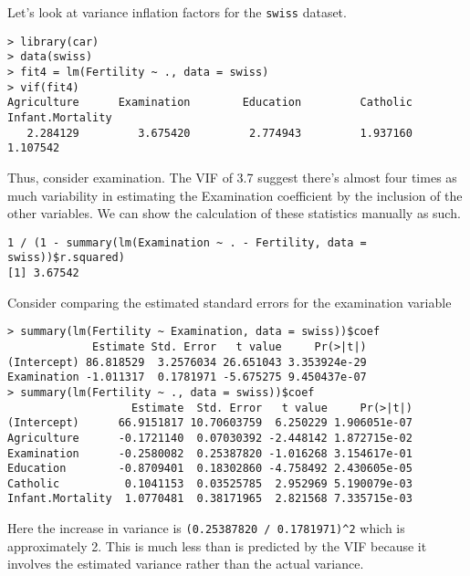 Let's look at variance inflation factors for the \texttt{swiss} dataset.
\begin{verbatim}
> library(car)
> data(swiss)
> fit4 = lm(Fertility ~ ., data = swiss)
> vif(fit4)
Agriculture      Examination        Education         Catholic Infant.Mortality 
   2.284129         3.675420         2.774943         1.937160         1.107542 
\end{verbatim}
Thus, consider examination. The VIF of 3.7 suggest there's almost four times as
much variability in estimating the Examination coefficient by the inclusion of the
other variables. We can show the calculation of these statistics manually as such.

\begin{verbatim}
1 / (1 - summary(lm(Examination ~ . - Fertility, data = swiss))$r.squared)
[1] 3.67542
\end{verbatim}

Consider comparing the estimated standard errors for the examination variable
\begin{verbatim}
> summary(lm(Fertility ~ Examination, data = swiss))$coef
             Estimate Std. Error   t value     Pr(>|t|)
(Intercept) 86.818529  3.2576034 26.651043 3.353924e-29
Examination -1.011317  0.1781971 -5.675275 9.450437e-07
> summary(lm(Fertility ~ ., data = swiss))$coef
                   Estimate  Std. Error   t value     Pr(>|t|)
(Intercept)      66.9151817 10.70603759  6.250229 1.906051e-07
Agriculture      -0.1721140  0.07030392 -2.448142 1.872715e-02
Examination      -0.2580082  0.25387820 -1.016268 3.154617e-01
Education        -0.8709401  0.18302860 -4.758492 2.430605e-05
Catholic          0.1041153  0.03525785  2.952969 5.190079e-03
Infant.Mortality  1.0770481  0.38171965  2.821568 7.335715e-03
\end{verbatim}
Here the increase in variance is \texttt{(0.25387820 / 0.1781971)^2} which is approximately
2. This is much less than is predicted by the VIF because it involves the estimated
variance rather than the actual variance. 


